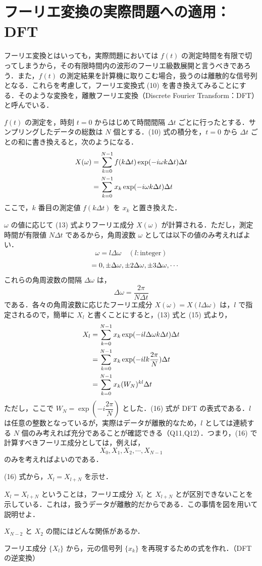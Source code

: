 \documentclass[a4paper,10pt]{article}
\newenvironment{questions}{\begin{list}{}{\setlength{\leftmargin}{3em}\setlength{\labelwidth}{2.8em}\setlength{\labelsep}{.2em}\setlength{\itemsep}{0pt}\setlength{\parsep}{0pt}\setlength{\topsep}{10pt}}}{\end{list}}
\newcommand{\q}[1]{\item[{\makebox[2.8em][l]{Q#1}}]}
\begin{document}
\section{フーリエ変換の実際問題への適用：DFT}
フーリエ変換とはいっても，実際問題においては $f(t)$ の測定時間を有限で切ってしまうから，その有限時間内の波形のフーリエ級数展開と言うべきであろう．また，$f(t)$ の測定結果を計算機に取りこむ場合，扱うのは離散的な信号列となる．これらを考慮して，フーリエ変換式 (10) を書き換えてみることにする．そのような変換を，離散フーリエ変換（Discrete Fourier Transform：DFT）と呼んでいる．

$f(t)$ の測定を，時刻 $t=0$ からはじめて時間間隔 $\Delta t$ ごとに行ったとする．サンプリングしたデータの総数は $N$ 個とする．(10) 式の積分を，$t=0$ から $\Delta t$ ごとの和に書き換えると，次のようになる．
\begin{align}
X(\omega)&=\sum_{k=0}^{N-1}f(k\Delta t)\exp(-i\omega k\Delta t)\Delta t\notag\\
&=\sum_{k=0}^{N-1}x_k\exp(-i\omega k\Delta t)\Delta t
\end{align}
\noindent ここで，$k$ 番目の測定値 $f(k\Delta t)$ を $x_k$ と置き換えた．

$\omega$ の値に応じて (13) 式よりフーリエ成分 $X(\omega)$ が計算される．ただし，測定時間が有限値 $N\Delta t$ であるから，角周波数 $\omega$ としては以下の値のみ考えればよい．
\[
\omega=l\Delta\omega\quad(l:\text{integer})
\]
\newpage
\begin{equation}
\hphantom{\omega}\ =0,\pm\Delta\omega,\pm2\Delta\omega,\pm3\Delta\omega,\cdots
\end{equation}
\noindent これらの角周波数の間隔 $\Delta\omega$ は，
\begin{equation}
\Delta\omega=\frac{2\pi}{N\Delta t}
\end{equation}
\noindent である．各々の角周波数に応じたフーリエ成分 $X(\omega)=X(l\Delta\omega)$ は，$l$ で指定されるので，簡単に $X_l$ と書くことにすると，(13) 式と (15) 式より，
\begin{align}
X_l&=\sum_{k=0}^{N-1}x_k\exp(-il\Delta\omega k\Delta t)\Delta t\notag\\
&=\sum_{k=0}^{N-1}x_k\exp(-ilk\frac{2\pi}{N})\Delta t\notag\\
&=\sum_{k=0}^{N-1}x_k(W_N)^{kl}\Delta t
\end{align}
\noindent ただし，ここで $W_N=\exp(-i\dfrac{2\pi}{N})$ とした．(16) 式が DFT の表式である．$l$ は任意の整数となっているが，実際はデータが離散的なため，$l$ としては連続する $N$ 個のみ考えれば充分であることが確認できる（Q11,Q12）．つまり，(16) で計算すべきフーリエ成分としては，例えば，
\begin{equation}
X_0,X_1,X_2,\cdots,X_{N-1}
\end{equation}
\noindent のみを考えればよいのである．
\begin{questions}
\q{11} (16) 式から，$X_l=X_{l+N}$ を示せ．
\q{12} $X_l=X_{l+N}$ ということは，フーリエ成分 $X_l$ と $X_{l+N}$ とが区別できないことを示している．これは，扱うデータが離散的だからである．この事情を図を用いて説明せよ．
\q{13} $X_{N-2}$ と $X_2$ の間にはどんな関係があるか．
\q{14} フーリエ成分 $\{X_l\}$ から，元の信号列 $\{x_k\}$ を再現するための式を作れ．（DFT の逆変換）
\end{questions}
\end{document}
